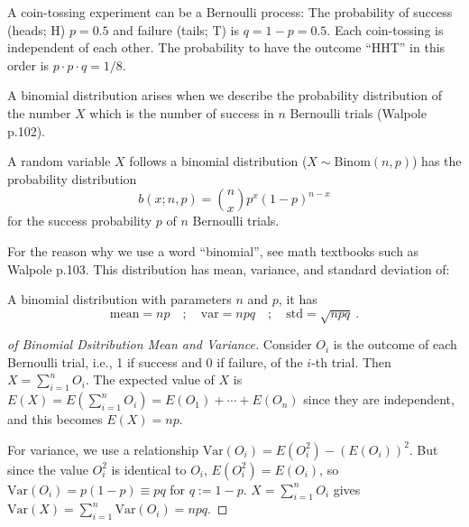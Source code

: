 A coin-tossing experiment can be a Bernoulli process: The probability of success (heads; H) $ p = 0.5 $ and failure (tails; T) is $ q = 1 - p = 0.5 $. Each coin-tossing is independent of each other. The probability to have the outcome ``HHT'' in this order is $ p \cdot p \cdot q = 1/8 $.

A binomial distribution arises when we describe the probability distribution of the number $ X $ which is the number of success in $ n $ Bernoulli trials (Walpole p.102). 

\begin{defn}
A random variable $ X $ follows a binomial distribution ($ X \sim \mathrm{Binom}(n, p) $) has the probability distribution
  \begin{equation}\label{def: binom}
    b(x; n, p) = \binom{n}{x} p^x (1 - p)^{n - x}
  \end{equation}
for the success probability $ p $ of $ n $ Bernoulli trials.
\end{defn}

For the reason why we use a word ``binomial'', see math textbooks such as Walpole p.103. This distribution has mean, variance, and standard deviation of:
\begin{thm} \label{thm: binom mean var std}
A binomial distribution with parameters $ n $ and $ p $, it has
  \begin{equation}\label{eq: binom mean var std}
    \mathrm{mean} = np \quad;\quad
    \mathrm{var} = npq \quad;\quad
    \mathrm{std} = \sqrt{npq} ~.
  \end{equation}
\end{thm}
\begin{proof}[of Binomial Dsitribution Mean and Variance]
Consider $ O_i $ is the outcome of each Bernoulli trial, i.e., 1 if success and 0 if failure, of the $ i $-th trial. Then $ X = \sum_{i=1}^{n} O_i $. The expected value of $ X $ is $ E(X) = E(\sum_{i=1}^{n} O_i) = E(O_1) + \cdots + E(O_n) $ since they are independent, and this becomes $ E(X) = np $.

For variance, we use a relationship $ \mathrm{Var}(O_i) = E(O_i^2) - (E(O_i))^2 $. But since the value $ O_i^2 $ is identical to $ O_i $, $ E(O_i^2) = E(O_i) $, so $ \mathrm{Var}(O_i) = p(1-p) \equiv pq $ for $ q := 1-p $. $ X = \sum_{i=1}^{n} O_i $ gives $ \mathrm{Var}(X) = \sum_{i=1}^{n} \mathrm{Var}(O_i) = npq $.
\end{proof}


